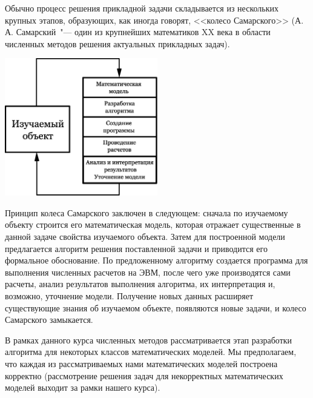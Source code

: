 \documentclass[11pt,a4paper,twoside]{report}
\numberwithin{equation}{section}
\theoremstyle{definition}
\theoremstyle{plain}
\begin{document}
Обычно процесс решения прикладной задачи складывается из нескольких крупных
этапов, образующих, как иногда говорят, <<колесо Самарского>>
(А.\,А. Самарский~"--- один из крупнейших математиков XX века в области
численных методов решения актуальных прикладных задач).
%
\begin{center}
    \includegraphics[width=0.5\textwidth]{circle.eps}\\
\end{center}
%

Принцип колеса Самарского заключен в следующем: сначала по изучаемому
объекту строится его математическая модель, которая отражает существенные в
данной задаче свойства изучаемого объекта. Затем для построенной модели
предлагается алгоритм решения поставленной задачи и приводится его формальное
обоснование. По предложенному алгоритму создается программа для выполнения
численных расчетов на ЭВМ, после чего уже производятся сами расчеты, анализ
результатов выполнения алгоритма, их интерпретация и, возможно, уточнение
модели. Получение новых данных расширяет существующие знания об изучаемом
объекте, появляются новые задачи, и колесо Самарского замыкается.

В рамках данного курса численных методов рассматривается этап разработки
алгоритма для некоторых классов математических моделей. Мы предполагаем, что
каждая из рассматриваемых нами математических моделей построена корректно
(рассмотрение решения задач для некорректных математических моделей выходит
за рамки нашего курса).
\end{document}
